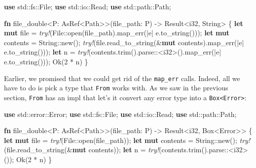 \documentclass[a4paper,]{book}
\newenvironment{Shaded}{\begin{snugshade}}{\end{snugshade}}
\newcommand{\KeywordTok}[1]{\textcolor[rgb]{0.13,0.29,0.53}{\textbf{{#1}}}}
\newcommand{\DataTypeTok}[1]{\textcolor[rgb]{0.13,0.29,0.53}{{#1}}}
\newcommand{\DecValTok}[1]{\textcolor[rgb]{0.00,0.00,0.81}{{#1}}}
\newcommand{\ConstantTok}[1]{\textcolor[rgb]{0.00,0.00,0.00}{{#1}}}
\newcommand{\PreprocessorTok}[1]{\textcolor[rgb]{0.56,0.35,0.01}{\textit{{#1}}}}
\newcommand{\NormalTok}[1]{{#1}}
\begin{document}
\begin{Shaded}
\begin{Highlighting}[]
\KeywordTok{use} \NormalTok{std::fs::File;}
\KeywordTok{use} \NormalTok{std::io::Read;}
\KeywordTok{use} \NormalTok{std::path::Path;}

\KeywordTok{fn} \NormalTok{file_double<P: AsRef<Path>>(file_path: P) -> }\DataTypeTok{Result}\NormalTok{<}\DataTypeTok{i32}\NormalTok{, }\DataTypeTok{String}\NormalTok{> \{}
    \KeywordTok{let} \KeywordTok{mut} \NormalTok{file = }\PreprocessorTok{try!}\NormalTok{(File::open(file_path).map_err(|e| e.to_string()));}
    \KeywordTok{let} \KeywordTok{mut} \NormalTok{contents = }\DataTypeTok{String}\NormalTok{::new();}
    \PreprocessorTok{try!}\NormalTok{(file.read_to_string(&}\KeywordTok{mut} \NormalTok{contents).map_err(|e| e.to_string()));}
    \KeywordTok{let} \NormalTok{n = }\PreprocessorTok{try!}\NormalTok{(contents.trim().parse::<}\DataTypeTok{i32}\NormalTok{>().map_err(|e| e.to_string()));}
    \ConstantTok{Ok}\NormalTok{(}\DecValTok{2} \NormalTok{* n)}
\NormalTok{\}}
\end{Highlighting}
\end{Shaded}

Earlier, we promised that we could get rid of the \texttt{map\_err}
calls. Indeed, all we have to do is pick a type that \texttt{From} works
with. As we saw in the previous section, \texttt{From} has an impl that
let's it convert any error type into a
\texttt{Box\textless{}Error\textgreater{}}:

\begin{Shaded}
\begin{Highlighting}[]
\KeywordTok{use} \NormalTok{std::error::Error;}
\KeywordTok{use} \NormalTok{std::fs::File;}
\KeywordTok{use} \NormalTok{std::io::Read;}
\KeywordTok{use} \NormalTok{std::path::Path;}

\KeywordTok{fn} \NormalTok{file_double<P: AsRef<Path>>(file_path: P) -> }\DataTypeTok{Result}\NormalTok{<}\DataTypeTok{i32}\NormalTok{, }\DataTypeTok{Box}\NormalTok{<Error>> \{}
    \KeywordTok{let} \KeywordTok{mut} \NormalTok{file = }\PreprocessorTok{try!}\NormalTok{(File::open(file_path));}
    \KeywordTok{let} \KeywordTok{mut} \NormalTok{contents = }\DataTypeTok{String}\NormalTok{::new();}
    \PreprocessorTok{try!}\NormalTok{(file.read_to_string(&}\KeywordTok{mut} \NormalTok{contents));}
    \KeywordTok{let} \NormalTok{n = }\PreprocessorTok{try!}\NormalTok{(contents.trim().parse::<}\DataTypeTok{i32}\NormalTok{>());}
    \ConstantTok{Ok}\NormalTok{(}\DecValTok{2} \NormalTok{* n)}
\NormalTok{\}}
\end{Highlighting}
\end{Shaded}
\end{document}
